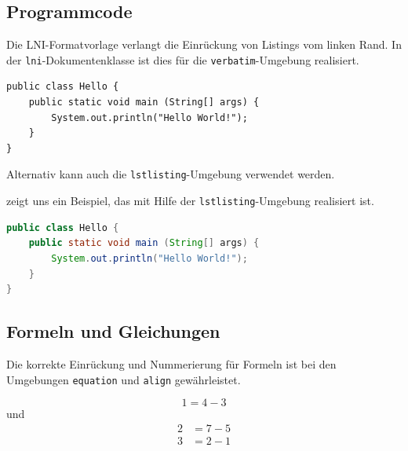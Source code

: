 \documentclass[utf8,biblatex]{bremerhaven_lni}
\begin{document}
\subsection{Programmcode}
Die LNI-Formatvorlage verlangt die Einrückung von Listings vom linken Rand.
In der \texttt{lni}-Dokumentenklasse ist dies für die \texttt{verbatim}-Umgebung realisiert.

\begin{verbatim}
public class Hello {
    public static void main (String[] args) {
        System.out.println("Hello World!");
    }
}
\end{verbatim}

Alternativ kann auch die \texttt{lstlisting}-Umgebung verwendet werden.

 zeigt uns ein Beispiel, das mit Hilfe der \texttt{lstlisting}-Umgebung realisiert ist.

\begin{lstlisting}[caption={Beschreibung}, label=L1, language=Java]
public class Hello {
    public static void main (String[] args) {
        System.out.println("Hello World!");
    }
}
\end{lstlisting}

\subsection{Formeln und Gleichungen}

Die korrekte Einrückung und Nummerierung für Formeln ist bei den Umgebungen
\texttt{equation} und \texttt{align} gewährleistet.

\begin{equation}
  1=4-3
\end{equation}
und
\begin{align}
  2&=7-5\\
  3&=2-1
\end{align}

\printbibliography
\end{document}
